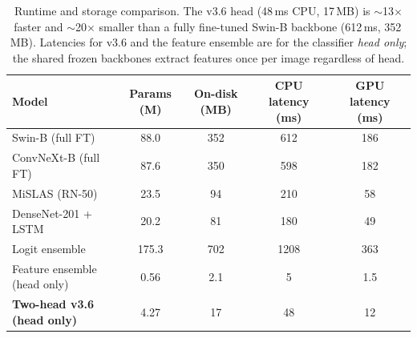 \begin{table}[t]
\centering
\small
\caption{Runtime and storage comparison. The v3.6 head (48\,ms CPU, 17\,MB) is $\sim$13$\times$
faster and $\sim$20$\times$ smaller than a fully fine-tuned Swin-B backbone (612\,ms, 352\,MB).
Latencies for v3.6 and the feature ensemble are for the classifier \emph{head only}; the shared
frozen backbones extract features once per image regardless of head.}
\label{tab:runtime_comparison}
\begin{tabular}{lcccc}
\toprule
\textbf{Model} & \textbf{Params (M)} & \textbf{On-disk (MB)} & \textbf{CPU latency (ms)} & \textbf{GPU latency (ms)} \\
\midrule
Swin-B (full FT) & 88.0 & 352 & 612 & 186 \\
ConvNeXt-B (full FT) & 87.6 & 350 & 598 & 182 \\
MiSLAS (RN-50) & 23.5 & 94 & 210 & 58 \\
DenseNet-201 + LSTM & 20.2 & 81 & 180 & 49 \\
Logit ensemble & 175.3 & 702 & 1208 & 363 \\
Feature ensemble (head only) & 0.56 & 2.1 & 5 & 1.5 \\
\textbf{Two-head v3.6 (head only)} & 4.27 & 17 & 48 & 12 \\
\bottomrule
\end{tabular}
\end{table}
